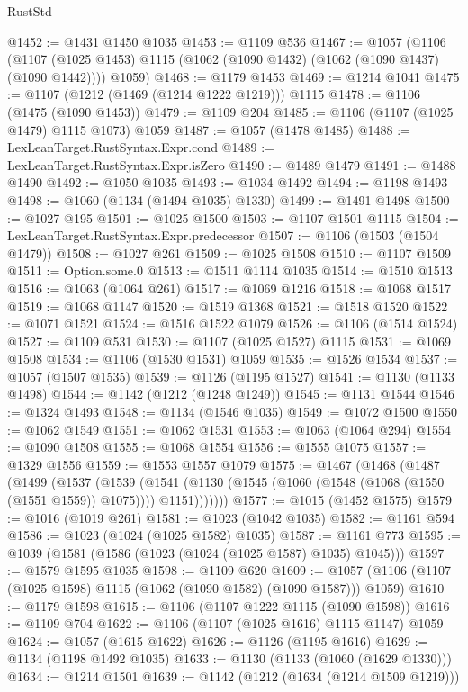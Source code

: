 \begin{lexlean}{RustStd}
\begin{coremodule}
@1452 := @1431 @1450 @1035
@1453 := @1109 @536
@1467 := @1057
    (@1106
      (@1107 (@1025 @1453) @1115 (@1062 (@1090 @1432) (@1062 (@1090 @1437) (@1090 @1442))))
      @1059)
@1468 := @1179 @1453
@1469 := @1214 @1041
@1475 := @1107 (@1212 (@1469 (@1214 @1222 @1219))) @1115
@1478 := @1106 (@1475 (@1090 @1453))
@1479 := @1109 @204
@1485 := @1106 (@1107 (@1025 @1479) @1115 @1073) @1059
@1487 := @1057 (@1478 @1485)
@1488 := LexLeanTarget.RustSyntax.Expr.cond
@1489 := LexLeanTarget.RustSyntax.Expr.isZero
@1490 := @1489 @1479
@1491 := @1488 @1490
@1492 := @1050 @1035
@1493 := @1034 @1492
@1494 := @1198 @1493
@1498 := @1060 (@1134 (@1494 @1035) @1330)
@1499 := @1491 @1498
@1500 := @1027 @195
@1501 := @1025 @1500
@1503 := @1107 @1501 @1115
@1504 := LexLeanTarget.RustSyntax.Expr.predecessor
@1507 := @1106 (@1503 (@1504 @1479))
@1508 := @1027 @261
@1509 := @1025 @1508
@1510 := @1107 @1509
@1511 := Option.some.{0}
@1513 := @1511 @1114 @1035
@1514 := @1510 @1513
@1516 := @1063 (@1064 @261)
@1517 := @1069 @1216
@1518 := @1068 @1517
@1519 := @1068 @1147
@1520 := @1519 @1368
@1521 := @1518 @1520
@1522 := @1071 @1521
@1524 := @1516 @1522 @1079
@1526 := @1106 (@1514 @1524)
@1527 := @1109 @531
@1530 := @1107 (@1025 @1527) @1115
@1531 := @1069 @1508
@1534 := @1106 (@1530 @1531) @1059
@1535 := @1526 @1534
@1537 := @1057 (@1507 @1535)
@1539 := @1126 (@1195 @1527)
@1541 := @1130 (@1133 @1498)
@1544 := @1142 (@1212 (@1248 @1249))
@1545 := @1131 @1544
@1546 := @1324 @1493
@1548 := @1134 (@1546 @1035)
@1549 := @1072 @1500
@1550 := @1062 @1549
@1551 := @1062 @1531
@1553 := @1063 (@1064 @294)
@1554 := @1090 @1508
@1555 := @1068 @1554
@1556 := @1555 @1075
@1557 := @1329 @1556
@1559 := @1553 @1557 @1079
@1575 := @1467
    (@1468
      (@1487
        (@1499
          (@1537
            (@1539
              (@1541 (@1130 (@1545 (@1060 (@1548 (@1068 (@1550 (@1551 @1559)) @1075)))) @1151)))))))
@1577 := @1015 (@1452 @1575)
@1579 := @1016 (@1019 @261)
@1581 := @1023 (@1042 @1035)
@1582 := @1161 @594
@1586 := @1023 (@1024 (@1025 @1582) @1035)
@1587 := @1161 @773
@1595 := @1039 (@1581 (@1586 (@1023 (@1024 (@1025 @1587) @1035) @1045)))
@1597 := @1579 @1595 @1035
@1598 := @1109 @620
@1609 := @1057 (@1106 (@1107 (@1025 @1598) @1115 (@1062 (@1090 @1582) (@1090 @1587))) @1059)
@1610 := @1179 @1598
@1615 := @1106 (@1107 @1222 @1115 (@1090 @1598))
@1616 := @1109 @704
@1622 := @1106 (@1107 (@1025 @1616) @1115 @1147) @1059
@1624 := @1057 (@1615 @1622)
@1626 := @1126 (@1195 @1616)
@1629 := @1134 (@1198 @1492 @1035)
@1633 := @1130 (@1133 (@1060 (@1629 @1330)))
@1634 := @1214 @1501
@1639 := @1142 (@1212 (@1634 (@1214 @1509 @1219)))

\end{coremodule}
\end{lexlean}
